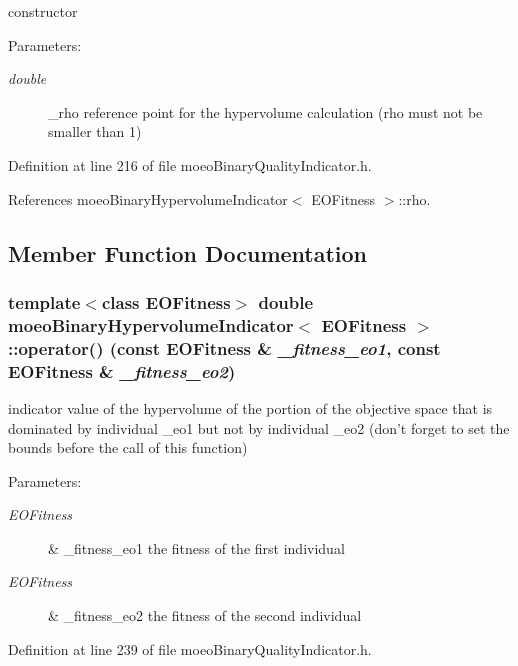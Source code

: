 constructor 

\begin{Desc}
\item[Parameters:]
\begin{description}
\item[{\em double}]\_\-rho reference point for the hypervolume calculation (rho must not be smaller than 1) \end{description}
\end{Desc}


Definition at line 216 of file moeo\-Binary\-Quality\-Indicator.h.

References moeo\-Binary\-Hypervolume\-Indicator$<$ EOFitness $>$::rho.

\subsection{Member Function Documentation}
\subsubsection{\setlength{\rightskip}{0pt plus 5cm}template$<$class EOFitness$>$ double {\bf moeo\-Binary\-Hypervolume\-Indicator}$<$ EOFitness $>$::operator() (const EOFitness \& {\em \_\-fitness\_\-eo1}, const EOFitness \& {\em \_\-fitness\_\-eo2})\hspace{0.3cm}{\tt  [inline]}}\label{classmoeoBinaryHypervolumeIndicator_697e7fcab99f5192925e2f2157d1e1a3}


indicator value of the hypervolume of the portion of the objective space that is dominated by individual \_\-eo1 but not by individual \_\-eo2 (don't forget to set the bounds before the call of this function) 

\begin{Desc}
\item[Parameters:]
\begin{description}
\item[{\em EOFitness}]\& \_\-fitness\_\-eo1 the fitness of the first individual \item[{\em EOFitness}]\& \_\-fitness\_\-eo2 the fitness of the second individual \end{description}
\end{Desc}


Definition at line 239 of file moeo\-Binary\-Quality\-Indicator.h.


